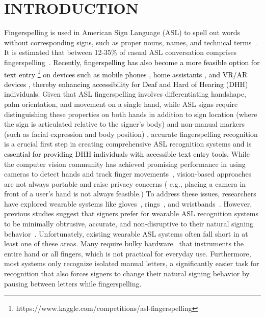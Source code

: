 \section{INTRODUCTION}




Fingerspelling is used in American Sign Language (ASL) to spell out words without corresponding signs, such as proper nouns, names, and technical terms~\cite{keane2016fingerspelling, hanson1982use}. It is estimated that between 12-35\% of casual ASL conversation comprises fingerspelling~\cite{padden2003alphabet, morere2012fingerspelling}. \textcolor{black}{Recently, fingerspelling has also become a more feasible option for text entry \footnote{https://www.kaggle.com/competitions/asl-fingerspelling} on devices such as mobile phones \cite{hassan2023tap, martin2023fingerspeller}, home assistants \cite{glasser2022analyzing, maria2024alexa}, and VR/AR devices \cite{hirabayashi2019development, gangakhedkar2024fingarspell,fujikawa2019development}, thereby enhancing accessibility for Deaf and Hard of Hearing (DHH) individuals.} Given that ASL fingerspelling involves differentiating handshape, palm orientation, and movement on a single hand, while ASL signs require distinguishing these properties on both hands in addition to sign location (where the sign is articulated relative to the signer's body) and non-manual markers (such as facial expression and body position) \cite{keane2015segmentation, valli1992linguistics}, accurate fingerspelling recognition is a crucial first step in creating comprehensive ASL recognition systems \textcolor{black}{ and is essential for providing DHH individuals with accessible text entry tools.}
While the computer vision community has achieved promising performance in using cameras to detect hands and track finger movements~\cite{aloysius2020understanding, shi2019fingerspelling,hu2020fingertrak}, vision-based approaches are not always portable and raise privacy concerns ( e.g., placing a camera in front of a user's hand is not always feasible.) To address these issues, researchers have explored wearable systems like gloves~\cite{kakoty2018recognition, ahmed2018review, oz2005recognition}, rings~\cite{martin2023fingerspeller,yu2024ring}, and wristbands~\cite{chen2018finger,lee2024echowrist}. However, previous studies suggest that signers prefer for wearable ASL recognition systems to be minimally obtrusive, accurate, and non-disruptive to their natural signing behavior~\cite{kudrinko2022assessing}. Unfortunately, existing wearable ASL systems often fall short in at least one of these areas. Many require bulky hardware~\cite{rizwan2019american, rinalduzzi2021gesture, lee2020sensor, martin2023fingerspeller, singh2023reliable,zhang2018fingerping} that instruments the entire hand or all fingers, which is not practical for everyday use. Furthermore, most systems only recognize isolated manual letters, a significantly easier task for recognition that also forces signers to change their natural signing behavior by pausing between letters while fingerspelling.
